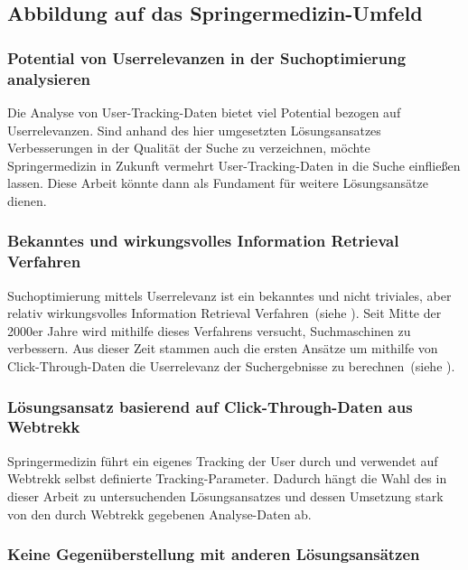 \subsection{Abbildung auf das Springermedizin-Umfeld}
\label{sec:Einfuehrung:ZielArbeit:AbbildungSpringermedizinUmfeld}

\subsubsection{Potential von Userrelevanzen in der Suchoptimierung analysieren}
\label{sec:Einfuehrung:ZielArbeit:Potential}

Die Analyse von User-Tracking-Daten bietet viel Potential bezogen auf Userrelevanzen. Sind anhand des hier umgesetzten Lösungsansatzes Verbesserungen in der Qualität der Suche zu verzeichnen, möchte Springermedizin in Zukunft vermehrt User-Tracking-Daten in die Suche einfließen lassen. Diese Arbeit könnte dann als Fundament für weitere Lösungsansätze dienen.

\subsubsection{Bekanntes und wirkungsvolles Information Retrieval Verfahren}
\label{sec:Einfuehrung:ZielArbeit:AbbildungSpringermedizinUmfeld:InformationRetrievalVerfahren}

Suchoptimierung mittels Userrelevanz ist ein bekanntes und nicht triviales, aber relativ wirkungsvolles Information Retrieval Verfahren~(siehe \cite{IWUSBI}). Seit Mitte der 2000er Jahre wird mithilfe dieses Verfahrens versucht, Suchmaschinen zu verbessern. Aus dieser Zeit stammen auch die ersten Ansätze um mithilfe von Click-Through-Daten die Userrelevanz der Suchergebnisse zu berechnen~(siehe \cite{Joachims}).

\subsubsection{Lösungsansatz basierend auf Click-Through-Daten aus Webtrekk}
\label{sec:Einfuehrung:ZielArbeit:AbbildungSpringermedizinUmfeld:Loesungsansatz}

Springermedizin führt ein eigenes Tracking der User durch und verwendet auf Webtrekk selbst definierte Tracking-Parameter. Dadurch hängt die Wahl des in dieser Arbeit zu untersuchenden Lösungsansatzes und dessen Umsetzung stark von den durch Webtrekk gegebenen Analyse-Daten ab.

\subsubsection{Keine Gegenüberstellung mit anderen Lösungsansätzen}
\label{sec:Einfuehrung:ZielArbeit:AbbildungSpringermedizinUmfeld:NichtBehandeln}

